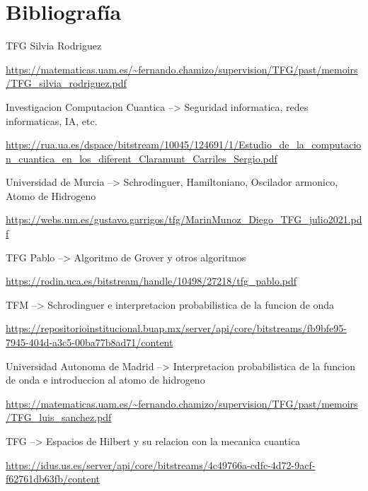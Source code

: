 \documentclass{article}
\numberwithin{equation}{section} %
\begin{document}
    \newpage
    \thispagestyle{empty}
    \mbox{}
    \newpage

    \section{Bibliografía}

        \vspace{5mm}

        TFG Silvia Rodriguez\par
        \url{https://matematicas.uam.es/~fernando.chamizo/supervision/TFG/past/memoirs/TFG_silvia_rodriguez.pdf}
        \vspace{2mm}

        Investigacion Computacion Cuantica --> Seguridad informatica, redes informaticas, IA, etc.\par
        \url{https://rua.ua.es/dspace/bitstream/10045/124691/1/Estudio_de_la_computacion_cuantica_en_los_diferent_Claramunt_Carriles_Sergio.pdf}
        \vspace{2mm}

        Universidad de Murcia --> Schrodinguer, Hamiltoniano, Oscilador armonico, Atomo de Hidrogeno\par
        \url{https://webs.um.es/gustavo.garrigos/tfg/MarinMunoz_Diego_TFG_julio2021.pdf}
        \vspace{2mm}

        TFG Pablo --> Algoritmo de Grover y otros algoritmos\par
        \url{https://rodin.uca.es/bitstream/handle/10498/27218/tfg_pablo.pdf}
        \vspace{2mm}

        TFM --> Schrodinguer e interpretacion probabilistica de la funcion de onda\par
        \url{https://repositorioinstitucional.buap.mx/server/api/core/bitstreams/fb9bfe95-7945-404d-a3c5-00ba77b8ad71/content}
        \vspace{2mm}

        Universidad Autonoma de Madrid --> Interpretacion probabilistica de la funcion de onda e introduccion al atomo de hidrogeno\par
        \url{https://matematicas.uam.es/~fernando.chamizo/supervision/TFG/past/memoirs/TFG_luis_sanchez.pdf}
        \vspace{2mm}

        TFG --> Espacios de Hilbert y su relacion con la mecanica cuantica\par
        \url{https://idus.us.es/server/api/core/bitstreams/4c49766a-cdfc-4d72-9acf-f62761db63fb/content}
        \vspace{2mm}
\end{document}
